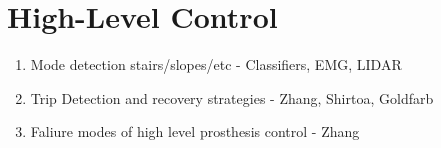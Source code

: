 \section{High-Level Control}\label{sec:back_high_level_control}
\begin{enumerate}
    \item Mode detection stairs/slopes/etc - Classifiers, EMG, LIDAR
    \item Trip Detection and recovery strategies - Zhang, Shirtoa, Goldfarb
    \item Faliure modes of high level prosthesis control - Zhang
\end{enumerate}
